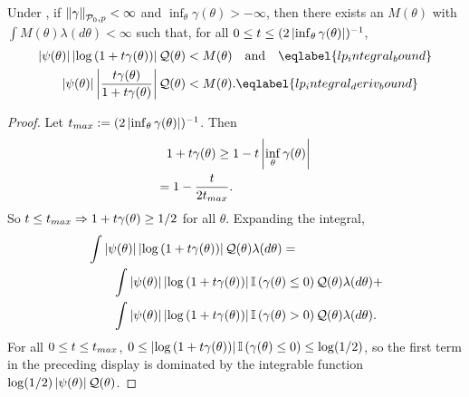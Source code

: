 \begin{lem}
%
Under , if $\left\Vert\gamma\right\Vert_{\mathcal{P}_{0}, p} < \infty$
and $\inf_\theta \gamma(\theta) > -\infty$, then there
exists an $M(\theta)$ with $\int M(\theta) \lambda(d\theta) < \infty$
such that, for all $0 \le t \le (2 \left|\inf_\theta \gamma(\theta)\right|)^{-1}$,
%
\begin{align}
%
\abs{\psi(\theta)}\abs{\log\left(1 + \t \gamma(\theta)\right)}\q(\theta)
    <{}& M(\theta) \mathand \eqlabel{lp_integral_bound}\\
%
\abs{\psi(\theta)}\abs{\frac{\t \gamma(\theta)}{1 + \t \gamma(\theta)}}\q(\theta)
    <{}& M(\theta). \eqlabel{lp_integral_deriv_bound}
%
\end{align}
%
\begin{proof}

Let $t_{max} := (2 \left|\inf_\theta \gamma(\theta)\right|)^{-1}$.  Then
%
\begin{align*}
%
1 + \t \gamma(\theta) \ge{}& 1 - \t \abs{\inf_\theta \gamma(\theta)}
\\={}
    1 - \frac{\t}{2 \t_{max}}.
%
\end{align*}
%
So $t \le t_{max} \Rightarrow 1 + t \gamma(\theta) \ge 1/2$ for all $\theta$.
Expanding the integral,
%
\begin{align*}
%
\MoveEqLeft
\int \abs{\psi(\theta)}
    \abs{\log\left(1 + \t \gamma(\theta)\right)}\q(\theta)
    \lambda(d\theta) ={}
\\&
\int \abs{\psi(\theta)}
    \abs{\log\left(1 + \t \gamma(\theta)\right)}
    \ind{\gamma(\theta) \le 0}
    \q(\theta)\lambda(d\theta)  +
\\&
\int \abs{\psi(\theta)}
    \abs{\log\left(1 + \t \gamma(\theta)\right)}
    \ind{\gamma(\theta) > 0}
    \q(\theta)\lambda(d\theta).
%
\end{align*}
%
For all $0 \le t \le t_{max}$, $0 \le \left|\log\left(1 + t
\gamma(\theta)\right)\right| \mathbb{I}\left(\gamma(\theta) \le 0\right) \le \log(1/2)$,
so the first term in the preceding display is dominated by the integrable
function $\log(1/2) \left|\psi(\theta)\right|\mathcal{Q}(\theta)$.


\end{proof}
\end{lem}
